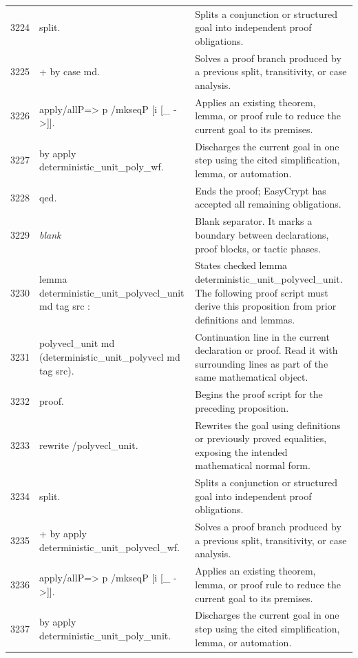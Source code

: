 \documentclass[10pt]{article}
\begin{document}
\begin{longtable}{r L{0.53\textwidth} L{0.37\textwidth}}
3224 & {\ttfamily\scriptsize split.} & Splits a conjunction or structured goal into independent proof obligations. \\
3225 & {\ttfamily\scriptsize + by case md.} & Solves a proof branch produced by a previous split, transitivity, or case analysis. \\
3226 & {\ttfamily\scriptsize apply/allP=> p /mkseqP [i [\_ ->]].} & Applies an existing theorem, lemma, or proof rule to reduce the current goal to its premises. \\
3227 & {\ttfamily\scriptsize by apply deterministic\_unit\_poly\_wf.} & Discharges the current goal in one step using the cited simplification, lemma, or automation. \\
3228 & {\ttfamily\scriptsize qed.} & Ends the proof; EasyCrypt has accepted all remaining obligations. \\
3229 & {\ttfamily\scriptsize \emph{blank}} & Blank separator.  It marks a boundary between declarations, proof blocks, or tactic phases. \\
3230 & {\ttfamily\scriptsize lemma deterministic\_unit\_polyvecl\_unit md tag src :} & States checked lemma deterministic\_unit\_polyvecl\_unit.  The following proof script must derive this proposition from prior definitions and lemmas. \\
3231 & {\ttfamily\scriptsize   polyvecl\_unit md (deterministic\_unit\_polyvecl md tag src).} & Continuation line in the current declaration or proof.  Read it with surrounding lines as part of the same mathematical object. \\
3232 & {\ttfamily\scriptsize proof.} & Begins the proof script for the preceding proposition. \\
3233 & {\ttfamily\scriptsize rewrite /polyvecl\_unit.} & Rewrites the goal using definitions or previously proved equalities, exposing the intended mathematical normal form. \\
3234 & {\ttfamily\scriptsize split.} & Splits a conjunction or structured goal into independent proof obligations. \\
3235 & {\ttfamily\scriptsize + by apply deterministic\_unit\_polyvecl\_wf.} & Solves a proof branch produced by a previous split, transitivity, or case analysis. \\
3236 & {\ttfamily\scriptsize apply/allP=> p /mkseqP [i [\_ ->]].} & Applies an existing theorem, lemma, or proof rule to reduce the current goal to its premises. \\
3237 & {\ttfamily\scriptsize by apply deterministic\_unit\_poly\_unit.} & Discharges the current goal in one step using the cited simplification, lemma, or automation. \\

\end{longtable}
\end{document}
